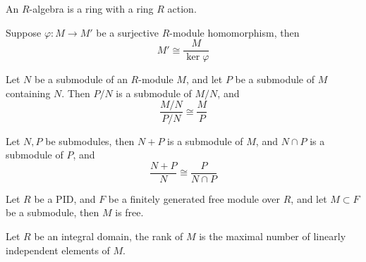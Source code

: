 \documentclass[openany]{book}
\begin{document}
\begin{defn}
    An $R$-algebra is a ring with a ring $R$ action.
\end{defn}

\begin{thm}
    Suppose $\varphi: M\to M'$ be a surjective $R$-module homomorphism, then 
    \begin{equation*}
        M'\cong\frac{M}{\ker\varphi}
    \end{equation*}
\end{thm}

\begin{prop}
    Let $N$ be a submodule of an $R$-module $M$, and let $P$ be a submodule of $M$ containing $N$. Then $P/N$ is a submodule of $M/N$, and 
    \begin{equation*}
        \frac{M/N}{P/N}\cong\frac{M}{P}
    \end{equation*}
\end{prop}

\begin{prop}
    Let $N,P$ be submodules, then $N+P$ is a submodule of $M$, and $N\cap P$ is a submodule of $P$, and 
    \begin{equation*}
        \frac{N+P}{N}\cong\frac{P}{N\cap P}
    \end{equation*}
\end{prop}


\begin{prop}
    Let $R$ be a PID, and $F$ be a finitely generated free module over $R$, and let $M\subset F$ be a submodule, then $M$ is free.
\end{prop}


\begin{defn}
    Let $R$ be an integral domain, the rank of $M$ is the maximal number of linearly independent elements of $M$.
\end{defn}
\end{document}
